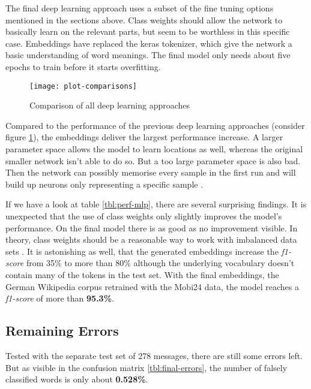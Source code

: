 The final deep learning approach uses a subset of the fine tuning options mentioned in the sections above. Class weights should allow the network to basically learn on the relevant parts, but seem to be worthless in this specific case. Embeddings have replaced the keras tokenizer, which give the network a basic understanding of word meanings. The final model only needs about five epochs to train before it starts overfitting.

\begin{figure}[!ht]
    \centering
    \texttt{[image: plot-comparisons]}
    \caption{Comparison of all deep learning approaches}
    \label{fig:plot-comparisons}
\end{figure}

Compared to the performance of the previous deep learning approaches (consider figure \ref{fig:plot-comparisons}), the embeddings deliver the largest performance increase. A larger parameter space allows the model to learn locations as well, whereas the original smaller network isn't able to do so. But a too large parameter space is also bad. Then the network can possibly memorise every sample in the first run and will build up neurons only representing a specific sample \cite{drop14}.

If we have a look at table \ref{tbl:perf-mlp}, there are several surprising findings. It is unexpected that the use of class weights only slightly improves the model's performance. On the final model there is as good as no improvement visible. In theory, class weights should be a reasonable way to work with imbalanced data sets \cite{imb18}. It is astonishing as well, that the generated embeddings increase the \emph{f1-score} from 35\% to more than 80\% although the underlying vocabulary doesn't contain many of the tokens in the test set. With the final embeddings, the German Wikipedia corpus retrained with the Mobi24 data, the model reaches a \emph{f1-score} of more than \textbf{95.3\%}.

\subsection{Remaining Errors}

Tested with the separate test set of 278 messages, there are still some errors left. But as visible in the confusion matrix \ref{tbl:final-errors}, the number of falsely classified words is only about \textbf{0.528\%}.

